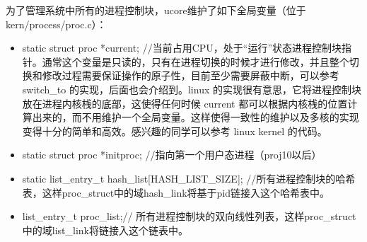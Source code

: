为了管理系统中所有的进程控制块，ucore维护了如下全局变量（位于kern/process/proc.c）：

\begin{itemize}
\item
  static struct proc *current;
  //当前占用CPU，处于``运行''状态进程控制块指针。通常这个变量是只读的，只有在进程切换的时候才进行修改，并且整个切换和修改过程需要保证操作的原子性，目前至少需要屏蔽中断，可以参考
  switch\_to 的实现，后面也会介绍到。linux
  的实现很有意思，它将进程控制块放在进程内核桟的底部，这使得任何时候
  current
  都可以根据内核桟的位置计算出来的，而不用维护一个全局变量。这样使得一致性的维护以及多核的实现变得十分的简单和高效。感兴趣的同学可以参考
  linux kernel 的代码。
\item
  static struct proc *initproc; //指向第一个用户态进程（proj10以后）
\item
  static list\_entry\_t hash\_list{[}HASH\_LIST\_SIZE{]};
  //所有进程控制块的哈希表，这样proc\_struct中的域hash\_link将基于pid链接入这个哈希表中。
\item
  list\_entry\_t proc\_list;//
  所有进程控制块的双向线性列表，这样proc\_struct中的域list\_link将链接入这个链表中。
\end{itemize}
